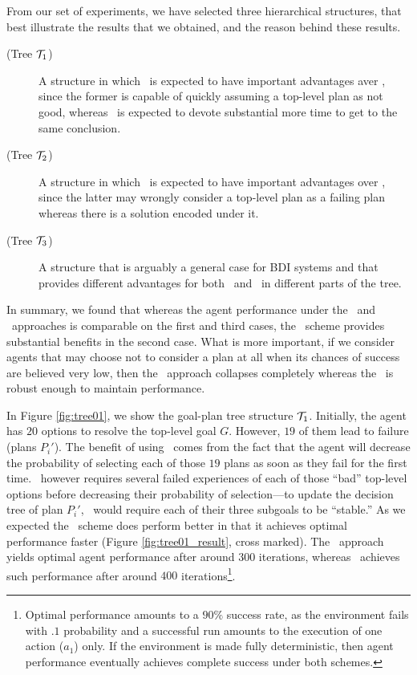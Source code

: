 From our set of experiments, we have selected three
hierarchical structures, that best illustrate the results that we
obtained, and the reason behind these results.
\begin{description}
\item[(Tree ${\mathcal{T}}_1$)] A structure in which \CL\ is expected to have
important advantages aver \BUL, since the former is capable of quickly
assuming a top-level plan as not good, whereas \BUL\ is expected to
devote substantial more time to get to the same conclusion. 

\item[(Tree ${\mathcal{T}}_2$)] A structure in which \BUL\ is expected to have
important advantages over \CL, since the latter may wrongly consider a
top-level plan as a failing plan whereas there is a solution encoded
under it. 

\item[(Tree ${\mathcal{T}}_3$)] A structure that is arguably a general case for
BDI systems and that provides different advantages for both \BUL\ and
\CL\ in different parts of the tree. 
\end{description}

In summary, we found that whereas the agent performance under the
\BUL\ and \CL\ approaches is comparable on the first and third cases,
the \BUL\ scheme provides substantial benefits in the second
case. What is more important, if we consider agents that may choose
not to consider a plan at all when its chances of success are believed
very low, then the \CL\ approach collapses completely whereas the
\BUL\ is robust enough to maintain performance.



In Figure \ref{fig:tree01}, we show the goal-plan tree structure
${\mathcal{T}}_1$. Initially, the agent has $20$ options to resolve the top-level
goal $G$. However, $19$ of them lead to failure (plans
$P_i'$). The benefit of using \CL\ comes from the fact that the agent
will decrease the probability of selecting each of those $19$ plans as
soon as they fail for the first time. \BUL\  however
requires several failed experiences of each of those ``bad'' top-level
options before decreasing their probability of selection---to update
the decision tree of plan $P_i'$, \BUL\ would require each of their
three subgoals to be ``stable.''
%
As we expected the \CL\ scheme does perform
better in that it achieves optimal performance faster (Figure
\ref{fig:tree01_result}, cross marked). The \CL\
approach yields optimal agent performance after around $300$
iterations, whereas \BUL\ achieves such performance after around $400$
iterations\footnote{Optimal performance amounts to a $90\%$
success rate, as the environment fails with $.1$ probability and a
successful run amounts to the execution of one action ($a_1$) only. If
the environment is made fully deterministic, then agent performance
eventually achieves complete success under both schemes.}.


